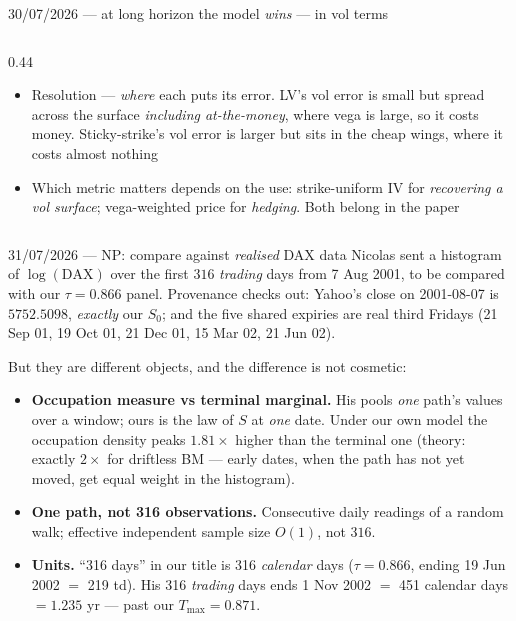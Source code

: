 \documentclass[aspectratio=169,11pt]{beamer}
\newcommand{\gold}[1]{{\color{ntugold}#1}}
\newcommand{\red}[1]{{\color{ntured}#1}}
\begin{document}
\begin{frame}[shrink=6]{30/07/2026 --- at long horizon the model \emph{wins} --- in vol terms}
\begin{columns}[T]
\begin{column}{0.44\linewidth}
\begin{itemize}
              wins at long horizon ($6.9$ vs $17.9$)
        \item Resolution --- \emph{where} each puts its error. LV's vol error is small but
              spread across the surface \emph{including at-the-money}, where vega is large,
              so it costs money. Sticky-strike's vol error is larger but sits in the cheap
              wings, where it costs almost nothing
        \item Which metric matters depends on the use: strike-uniform IV for
              \emph{recovering a vol surface}; vega-weighted price for \emph{hedging}.
              Both belong in the paper
      \end{itemize}
    \end{column}
  \end{columns}
\end{frame}


\begin{frame}[shrink=8]{31/07/2026 --- NP: compare against \emph{realised} DAX data}
  Nicolas sent a histogram of $\log(\mathrm{DAX})$ over the first $316$ \emph{trading} days
  from 7 Aug 2001, to be compared with our $\tau=0.866$ panel. Provenance checks out:
  Yahoo's close on 2001-08-07 is $5752.5098$, \emph{exactly} our $S_0$; and the five shared
  expiries are real third Fridays (21 Sep 01, 19 Oct 01, 21 Dec 01, 15 Mar 02, 21 Jun 02).

  \medskip
  \gold{But they are different objects}, and the difference is not cosmetic:
  \begin{itemize}\itemsep2pt
    \item \textbf{Occupation measure vs terminal marginal.} His pools \emph{one} path's
          values over a window; ours is the law of $S$ at \emph{one} date. Under our own
          model the occupation density peaks \red{$1.81\times$} higher than the terminal one
          (theory: exactly $2\times$ for driftless BM --- early dates, when the path has not
          yet moved, get equal weight in the histogram).
    \item \textbf{One path, not 316 observations.} Consecutive daily readings of a random
          walk; effective independent sample size $O(1)$, not $316$.
    \item \textbf{Units.} ``316 days'' in our title is 316 \emph{calendar} days
          ($\tau=0.866$, ending 19 Jun 2002 $=$ 219 td). His 316 \emph{trading} days ends
          1 Nov 2002 $=$ 451 calendar days $=1.235$ yr --- past our $T_{\max}=0.871$.
  \end{itemize}
\end{frame}
\end{document}
